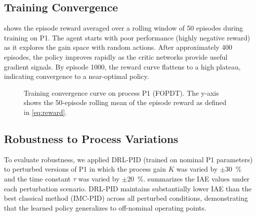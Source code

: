 \documentclass[conference,a4paper]{IEEEtran}[2015/08/26]
\begin{document}
\subsection{Training Convergence}

 shows the episode reward averaged over a rolling
window of 50 episodes during training on P1. The agent starts with
poor performance (highly negative reward) as it explores the gain space
with random actions. After approximately 400 episodes, the policy
improves rapidly as the critic networks provide useful gradient signals.
By episode 1000, the reward curve flattens to a high plateau, indicating
convergence to a near-optimal policy.

\begin{figure}[t]
  \centering
  \caption{Training convergence curve on process P1 (FOPDT). The
    y-axis shows the 50-episode rolling mean of the episode reward
    as defined in \cref{eq:reward}.}
  \label{fig:training}
\end{figure}

\subsection{Robustness to Process Variations}

To evaluate robustness, we applied DRL-PID (trained on nominal P1
parameters) to perturbed versions of P1 in which the process gain $K$
was varied by $\pm$\SI{30}{\percent} and the time constant $\tau$ was
varied by $\pm$\SI{20}{\percent}.  summarizes the
IAE values under each perturbation scenario. DRL-PID maintains
substantially lower IAE than the best classical method (IMC-PID) across
all perturbed conditions, demonstrating that the learned policy
generalizes to off-nominal operating points.
\end{document}
